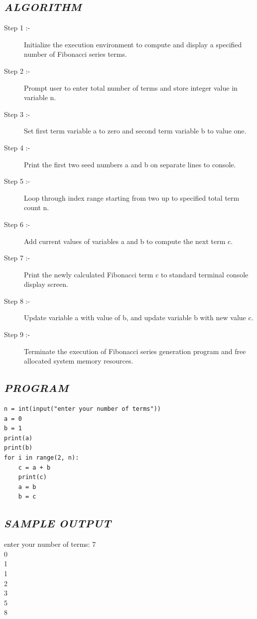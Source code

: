 \documentclass[11pt,a4paper]{article}
\begin{document}
\subsection*{\textit{ALGORITHM}}
\begin{description}
  \item[Step 1 :-] Initialize the execution environment to compute and display a specified number of Fibonacci series terms.
  \item[Step 2 :-] Prompt user to enter total number of terms and store integer value in variable n.
  \item[Step 3 :-] Set first term variable a to zero and second term variable b to value one.
  \item[Step 4 :-] Print the first two seed numbers a and b on separate lines to console.
  \item[Step 5 :-] Loop through index range starting from two up to specified total term count n.
  \item[Step 6 :-] Add current values of variables a and b to compute the next term c.
  \item[Step 7 :-] Print the newly calculated Fibonacci term c to standard terminal console display screen.
  \item[Step 8 :-] Update variable a with value of b, and update variable b with new value c.
  \item[Step 9 :-] Terminate the execution of Fibonacci series generation program and free allocated system memory resources.
\end{description}

\subsection*{\textit{PROGRAM}}
\begin{lstlisting}[style=pythonstyle]
n = int(input("enter your number of terms")) 
a = 0 
b = 1 
print(a) 
print(b) 
for i in range(2, n): 
    c = a + b 
    print(c)  
    a = b 
    b = c
\end{lstlisting}

\subsection*{\textit{SAMPLE OUTPUT}}
\begin{tcolorbox}[colback=black!85,colframe=navyblue,title=\textbf{Terminal Output},coltitle=white,fonttitle=\bfseries\small]
\small\ttfamily\color{green!30!white}
enter your number of terms: 7\\
0\\
1\\
1\\
2\\
3\\
5\\
8
\end{tcolorbox}
\end{document}
